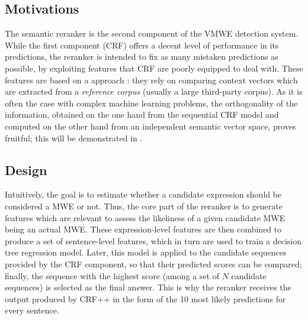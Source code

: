 \documentclass[output=paper,modfonts,nonflat]{langsci/langscibook}
\begin{document}
\subsection{Motivations} 
The semantic reranker
 is the second component of the VMWE detection
system. While the first component (CRF) offers a decent level of
performance in its predictions, the reranker is intended to fix as
many mistaken predictions as possible, by exploiting features that CRF
are poorly equipped to deal with. These features are based on a
 approach \citep{schutze1998,maldonado2011}:
they rely on comparing context vectors which are extracted from a {\em
  reference corpus} (usually a large third-party corpus). As it is
often the case with complex machine learning problems, the
orthogonality of the information, obtained on the one hand from the
sequential CRF model and computed on the other hand from an independent
semantic vector space, proves fruitful; this will be demonstrated in
.


\subsection{Design}

Intuitively, the goal is to estimate whether a candidate expression
should be considered a MWE or not. Thus, the core part of the reranker
is to generate features which are relevant to assess the likeliness of
a given candidate MWE being an actual MWE. These expression-level
features are then combined to produce a set of sentence-level
features, which in turn are used to train a decision tree regression
model. Later, this model is applied to the candidate sequences
provided by the CRF component, so that their predicted scores can be
compared; finally, the sequence with the highest score (among a set of
$N$ candidate sequences) is selected as the final answer. This is why
the reranker receives the output produced by CRF++ in the form of the
10 most likely predictions for every sentence.

\end{document}
